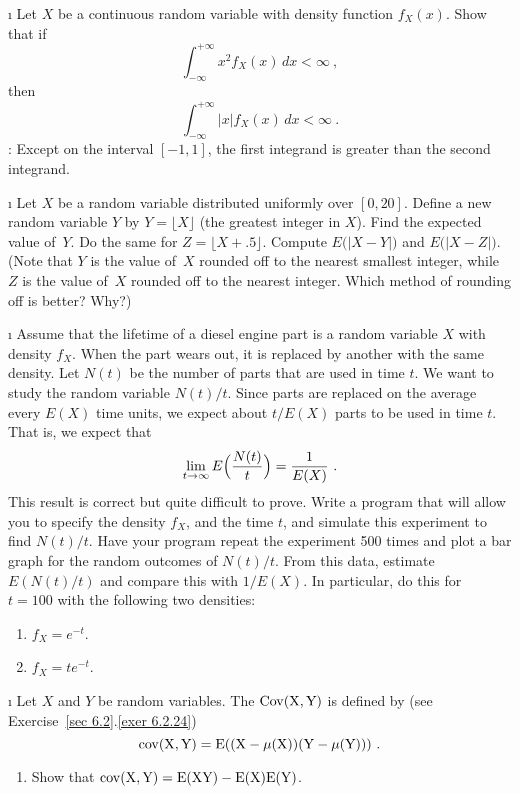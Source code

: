{\begin{LJSItem}
\i\label{exer 6.3.15.5} Let $X$ be a continuous random variable with density
function $f_X(x)$.  Show that if
$$
\int_{-\infty}^{+\infty} x^2 f_X(x)\, dx < \infty\ ,
$$ then
$$
\int_{-\infty}^{+\infty} |x| f_X(x)\, dx < \infty\ .
$$ 
 :  Except on the interval $[-1, 1]$, the first integrand is greater than the
second integrand.

\i\label{exer 6.3.16} Let $X$ be a random variable distributed uniformly over
$[0,20]$.  Define a new random variable $Y$ by $Y = \lfloor X\rfloor$ (the greatest
integer in $X$).  Find the expected value of~$Y$.  Do the same for $Z =
\lfloor X + .5\rfloor$.  Compute $E\bigl(|X-Y|\bigr)$ and $E\bigl(|X-Z|\bigr)$. 
(Note that
$Y$ is the value of~$X$ rounded off to the nearest smallest integer, while $Z$ is the
value of~$X$ rounded off to the nearest integer.  Which method of rounding off is
better?  Why?)

\i\label{exer 6.3.17} Assume that the lifetime of a diesel engine part is a random
variable $X$ with density $f_X$.  When the part wears out, it is replaced by another
with the same density.  Let $N(t)$ be the number of parts that are used in time
$t$.  We want to study the random variable $N(t)/t$.  Since parts are replaced on the
average every $E(X)$ time units, we expect about $t/E(X)$ parts to be used in time
$t$.  That is, we expect that
$$
\lim_{t \to \infty} E \Bigl(\frac {N(t)}t\Bigr) = \frac 1{E(X)}\ .
$$ This result is correct but quite difficult to prove.  Write a program that will
allow you to specify the density $f_X$, and the time $t$, and simulate this
experiment to find $N(t)/t$.  Have your program repeat the experiment 500 times and
plot a bar graph for the random outcomes of $N(t)/t$.  From this data, estimate
$E(N(t)/t)$ and compare this with $1/E(X)$.  In particular, do this for~$t = 100$
with the following two densities:

\begin{enumerate}
\item $f_X = e^{-t}$.

\item $f_X = te^{-t}$.
\end{enumerate}

\i\label{exer 6.3.18} Let $X$ and $Y$ be random variables.  The  
$\rm {Cov}(X,Y)$ is defined by (see Exercise~\ref{sec 6.2}.\ref{exer 6.2.24})
$$
\rm {cov}(X,Y) = E ((X - \mu(X))(Y - \mu(Y)) )\ .
$$
\begin{enumerate}
\item Show that $\rm {cov}(X,Y) = E(XY) - E(X)E(Y)$.


\end{enumerate}
\end{LJSItem}}
